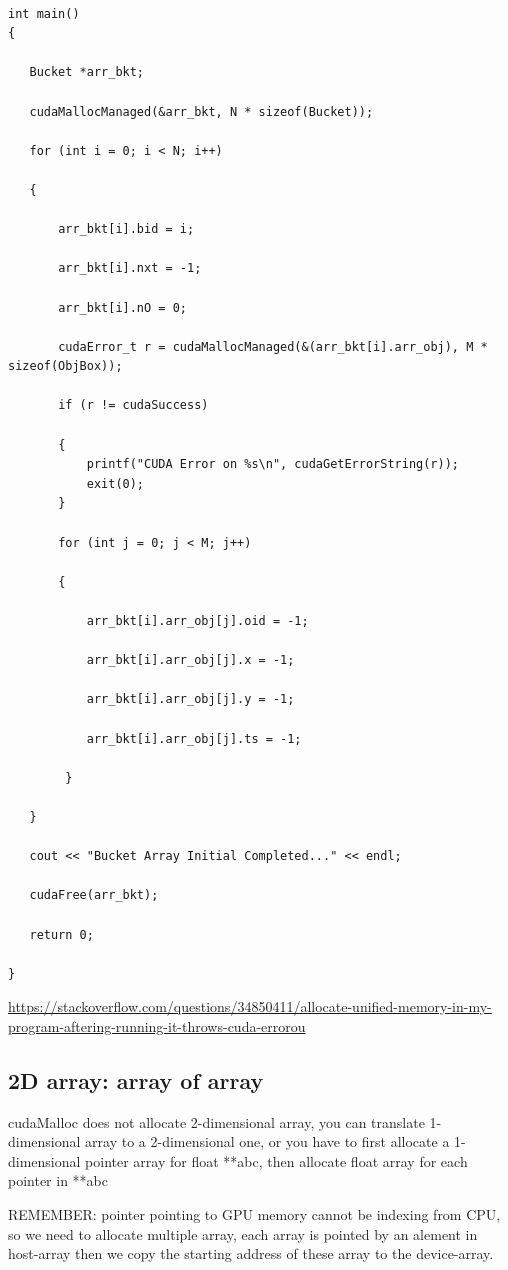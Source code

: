 \begin{lstlisting}

int main()
{

   Bucket *arr_bkt;

   cudaMallocManaged(&arr_bkt, N * sizeof(Bucket));

   for (int i = 0; i < N; i++)

   {

       arr_bkt[i].bid = i; 

       arr_bkt[i].nxt = -1;

       arr_bkt[i].nO = 0;

       cudaError_t r = cudaMallocManaged(&(arr_bkt[i].arr_obj), M * sizeof(ObjBox));

       if (r != cudaSuccess)

       {
           printf("CUDA Error on %s\n", cudaGetErrorString(r));
           exit(0);
       }

       for (int j = 0; j < M; j++)

       {

           arr_bkt[i].arr_obj[j].oid = -1;

           arr_bkt[i].arr_obj[j].x = -1;

           arr_bkt[i].arr_obj[j].y = -1;

           arr_bkt[i].arr_obj[j].ts = -1;

        }

   }

   cout << "Bucket Array Initial Completed..." << endl;

   cudaFree(arr_bkt);

   return 0;

}
\end{lstlisting}
\url{https://stackoverflow.com/questions/34850411/allocate-unified-memory-in-my-program-aftering-running-it-throws-cuda-errorou}

\subsection{2D array: array of array}
\label{sec:array-of-array-CUDA-C}
\label{sec:2d-array-GPU-memory}


cudaMalloc does not allocate 2-dimensional array, you can translate
1-dimensional array to a 2-dimensional one, or you have to first allocate a
1-dimensional pointer array for float **abc, then allocate float array for each
pointer in **abc

REMEMBER: pointer pointing to GPU memory cannot be indexing from CPU,
so we need to allocate multiple array, each array is pointed by an alement in
host-array then we copy the starting address of these array to the device-array.

